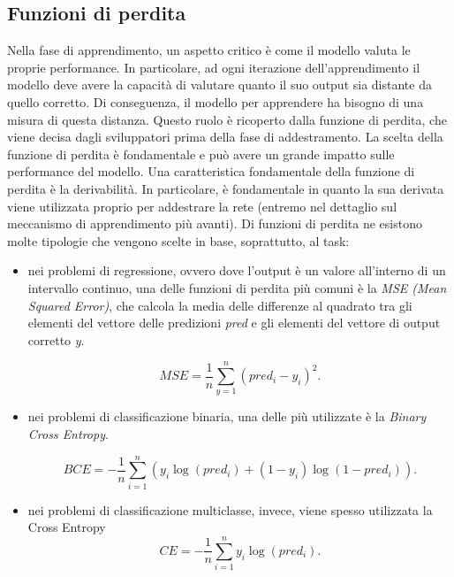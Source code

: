 \subsection{Funzioni di perdita}
Nella fase di apprendimento, un aspetto critico è come il modello valuta le proprie performance. In particolare, ad ogni iterazione dell'apprendimento il modello deve avere la capacità di valutare quanto il suo output sia distante da quello corretto. Di conseguenza, il modello per apprendere ha bisogno di una misura di questa distanza. Questo ruolo è ricoperto dalla funzione di perdita, che viene decisa dagli sviluppatori prima della fase di addestramento. La scelta della funzione di perdita è fondamentale e può avere un grande impatto sulle performance del modello. Una caratteristica fondamentale della funzione di perdita è la derivabilità. In particolare, è fondamentale in quanto la sua derivata viene utilizzata proprio per addestrare la rete (entremo nel dettaglio sul meccanismo di apprendimento più avanti). Di funzioni di perdita ne esistono molte tipologie che vengono scelte in base, soprattutto, al task:
\begin{itemize}
    \item nei problemi di regressione, ovvero dove l'output è un valore all'interno di un intervallo continuo, una delle funzioni di perdita più comuni è la \textit{MSE (Mean Squared Error)}, che calcola la media delle differenze al quadrato tra gli elementi del vettore delle predizioni \textit{pred} e gli elementi del vettore di output corretto \textit{y}.
    
    \begin{equation}
    MSE = \frac{1}{n}\sum_{y=1}^{n}(pred_{i} - y_{i})^{2}.
    \end{equation}

    \item nei problemi di classificazione binaria, una delle più utilizzate è la \textit{Binary Cross Entropy}.
    
    \begin{equation}
    BCE = -\frac{1}{n}\sum_{i=1}^{n}{(y_{i}\log(pred_{i}) + (1 - y_{i})\log(1 - pred_{i}))}.
    \end{equation}
    
    \item nei problemi di classificazione multiclasse, invece, viene spesso utilizzata la Cross Entropy
    \begin{equation}
    CE = -\frac{1}{n}\sum_{i=1}^{n}y_{i}\log(pred_{i}).
    \end{equation}
    
\end{itemize}

